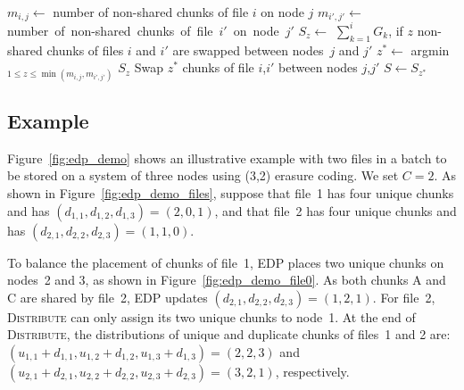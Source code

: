 \begin{algorithm}[H]
\begin{small}
\begin{algorithmic}[1]
	\State $m_{i,j} \!\leftarrow\!$ number of non-shared chunks of file $i$ on node $j$
	\State $m_{i',j'} \!\leftarrow\!$ \mbox{number of non-shared chunks of
		file $i'$ on node $j'$}
            \State $S_{z} \leftarrow$ $\sum_{k=1}^{i} G_k$, if $z$ non-shared
			chunks of 
			\Statex\hspace{0.5in} files $i$ and $i'$ are swapped between nodes~$j$ and $j'$ 
          \EndFor
         \State $z^* \leftarrow$ argmin$_{1 \le z \le \min(m_{i,j},m_{i',j'})}$ $S_{z}$
	  \State Swap $z^*$ chunks of file $i$,$i'$ between nodes $j$,$j'$
           \State $S \leftarrow S_{z^*}$
	\EndIf
      \EndFor
\EndFunction
\end{algorithmic}
\end{small}
\end{algorithm}

\subsection{Example} 

Figure~\ref{fig:edp_demo} shows an illustrative
example with two files in a batch to be stored on a system of three nodes
using (3,2) erasure coding.  We set $C = 2$.  As shown in
Figure~\ref{fig:edp_demo_files}, suppose that file~1 has four unique chunks
and has $(d_{1,1},d_{1,2},d_{1,3}) = (2,0,1)$, and that file~2 has four unique
chunks and has $(d_{2,1},d_{2,2},d_{2,3}) = (1,1,0)$.

To balance the placement of chunks of file~1, EDP places two unique chunks on 
nodes~2 and 3, as shown in Figure~\ref{fig:edp_demo_file0}.
As both chunks A and C are shared by file~2, EDP updates 
$(d_{2,1},d_{2,2},d_{2,3}) = (1,2,1)$.  For file~2, 
\textsc{Distribute} can only assign its two unique chunks to node~1.  At the
end of \textsc{Distribute}, the distributions of unique and duplicate chunks
of files~1 and 2 are: 
$(u_{1,1}+d_{1,1},u_{1,2}+d_{1,2},u_{1,3}+d_{1,3}) = (2,2,3)$ and
$(u_{2,1}+d_{2,1},u_{2,2}+d_{2,2},u_{2,3}+d_{2,3}) = (3,2,1)$, respectively.

